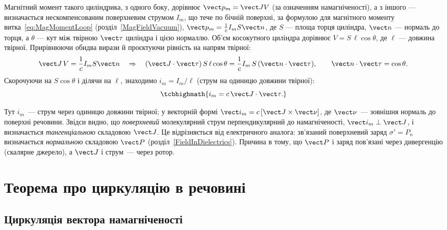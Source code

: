 Магнітний момент такого циліндрика, з одного боку, дорівнює $\vect p_m = \vect J V$ (за означенням намагніченості), а з іншого --- визначається
нескомпенсованим поверхневим струмом $I_m$, що тече по бічній поверхні, за формулою для магнітного моменту витка~\eqref{eq:MagMomentLoop}
(розділ~\ref{MagFieldVacuum}), $\vect p_m = \frac1c I_m S\vect n$, де $S$ --- площа торця циліндра, $\vect n$ --- нормаль до торця, а $\theta$ ---
кут між твірною $\vect\tau$ циліндра і цією нормаллю. Об'єм косокутного циліндра дорівнює $V = S\,\ell\cos\theta$, де $\ell$ --- довжина
твірної. Прирівнюючи обидва вирази й проєктуючи рівність на напрям твірної:
\begin{equation*}
	\vect J\, V = \frac1c I_m S\vect n \quad\Rightarrow\quad (\vect J\cdot\vect\tau)\, S\,\ell\cos\theta = \frac1c I_m\, S\,(\vect n\cdot\vect\tau),
	\qquad \vect n\cdot\vect\tau = \cos\theta.
\end{equation*}
Скорочуючи на $S\cos\theta$ і ділячи на $\ell$, знаходимо  $i_m = I_m/\ell$ (струм на одиницю довжини твірної):
\begin{equation}\label{eq:MolecularSurfaceCurrent}
	\tcbhighmath{
		i_m = c\, \vect J\cdot\vect\tau.
	}
\end{equation}

Тут $i_m$~--- струм через одиницю довжини твірної; у векторній формі $\vect i_m = c\,[\vect J\times\vect\nu]$, де $\vect\nu$~--- зовнішня нормаль до поверхні речовини. Звідси видно, що \emph{поверхневий} молекулярний струм перпендикулярний до намагніченості, $\vect i_m\perp\vect J$, і визначається \emph{тангенціальною} складовою $\vect J$. Це відрізняється від електричного аналога: зв'язаний поверхневий заряд $\sigma'=P_n$ визначається \emph{нормальною} складовою $\vect P$ (розділ~\ref{FieldInDielectrics}). Причина в тому, що $\vect P$ і заряд пов'язані через дивергенцію (скалярне джерело), а $\vect J$ і струм~--- через ротор.

\section{Теорема про циркуляцію в речовині}\hypertarget{circulation-theorem-in-matter}{}

\subsection*{Циркуляція вектора намагніченості}

